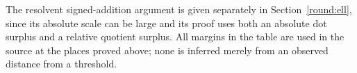 The resolvent signed-addition argument is given separately in
Section~\ref{round:ell}, since its absolute scale can be large and
its proof uses both an absolute dot surplus and a relative quotient
surplus.  All margins in the table are used in the source at the
places proved above; none is inferred merely from an observed
distance from a threshold.
